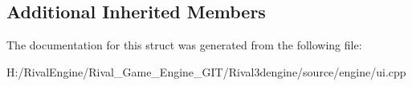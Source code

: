 \subsection*{Additional Inherited Members}


The documentation for this struct was generated from the following file\+:\begin{DoxyCompactItemize}
\item 
H\+:/\+Rival\+Engine/\+Rival\+\_\+\+Game\+\_\+\+Engine\+\_\+\+G\+I\+T/\+Rival3dengine/source/engine/ui.\+cpp\end{DoxyCompactItemize}
